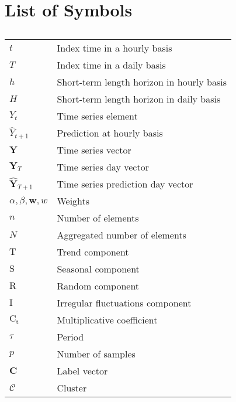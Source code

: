 %



\chapter{List of Symbols}
\label{los}


\begin{table}[!htb]
\centering
  \caption*{}
\begin{tabular}{l l }

$t$ &   Index time in a hourly basis  \\
$T$ &   Index time in a daily basis \\
$h$ &   Short-term length horizon in hourly basis\\
$H$ &   Short-term length horizon in daily basis\\
$Y_t$ & Time series element\\
$\hat{Y}_{t+1}$ & Prediction at hourly basis\\
$\mathbf{Y}$ & Time series vector\\
$\mathbf{{Y}}_{T}$ & Time series day vector\\
$\mathbf{\hat{Y}}_{T+1}$ & Time series prediction day vector\\
$\alpha,\beta, \mathbf{w}, w$  &  Weights\\


$n$ & Number of elements\\
$N$ & Aggregated number of elements\\
$\mathrm{T}$ & Trend component\\
$\mathrm{S}$ & Seasonal component\\
$\mathrm{R}$ & Random component\\
$\mathrm{I}$ & Irregular fluctuations component\\
$\mathrm{C_t}$ & Multiplicative coefficient\\
$\tau$ & Period\\
$p$ & Number of samples\\
$\mathbf{C}$ & Label vector  \\
$\mathcal{C}$ & Cluster  \\



\end{tabular}
\label{tab:parameters}
\end{table}


